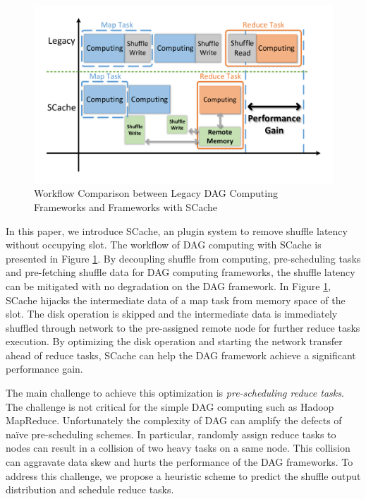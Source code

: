 \begin{figure}
	\centering
	\includegraphics[width=\linewidth]{fig/workflow}
	\caption{Workflow Comparison between Legacy DAG Computing Frameworks and Frameworks with SCache}
	\label{fig:workflow}
\end{figure}




In this paper, we introduce SCache, an plugin system to remove shuffle latency without occupying slot. The workflow of DAG computing with SCache is presented in Figure \ref{fig:workflow}. By decoupling shuffle from computing, pre-scheduling tasks and pre-fetching shuffle data for DAG computing frameworks, the shuffle latency can be mitigated with no degradation on the DAG framework. In Figure \ref{fig:workflow}, SCache hijacks the intermediate data of a map task from memory space of the slot. The disk operation is skipped and the intermediate data is immediately shuffled through network to the pre-assigned remote node for further reduce tasks execution. By optimizing the disk operation and starting the network transfer ahead of reduce tasks, SCache can help the DAG framework achieve a significant performance gain.

The main challenge to achieve this optimization is \textit{pre-scheduling reduce tasks}. The challenge is not critical for the simple DAG computing such as Hadoop MapReduce\cite{mapreduce}. Unfortunately the complexity of DAG can amplify the defects of na\"{i}ve pre-scheduling schemes. In particular, randomly assign reduce tasks to nodes can result in a collision of two heavy tasks on a same node. This collision can aggravate data skew and hurts the performance of the DAG frameworks. To address this challenge, we propose a heuristic scheme to predict the shuffle output distribution and schedule reduce tasks.

